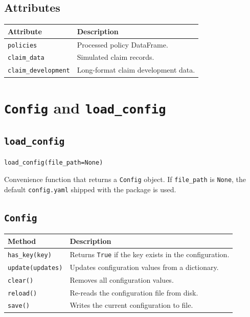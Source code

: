 \subsection*{Attributes}

\begin{longtable}{p{}p{}}
\toprule
\textbf{Attribute} & \textbf{Description} \\
\midrule
\endhead
\texttt{policies}            & Processed policy DataFrame. \\
\texttt{claim\_data}         & Simulated claim records. \\
\texttt{claim\_development}  & Long-format claim development data. \\
\bottomrule
\end{longtable}

\section{\texttt{Config} and \texttt{load\_config}}
\label{api:config}

\subsection*{\texttt{load\_config}}

\begin{lstlisting}[style=pythonstyle]
load_config(file_path=None)
\end{lstlisting}

Convenience function that returns a \texttt{Config} object. If
\texttt{file\_path} is \texttt{None}, the default \texttt{config.yaml}
shipped with the package is used.

\subsection*{\texttt{Config}}

\begin{longtable}{p{}p{}}
\toprule
\textbf{Method} & \textbf{Description} \\
\midrule
\endhead
\texttt{has\_key(key)} &
    Returns \texttt{True} if the key exists in the configuration. \\
\texttt{update(updates)} &
    Updates configuration values from a dictionary. \\
\texttt{clear()} &
    Removes all configuration values. \\
\texttt{reload()} &
    Re-reads the configuration file from disk. \\
\texttt{save()} &
    Writes the current configuration to file. \\
\bottomrule
\end{longtable}

